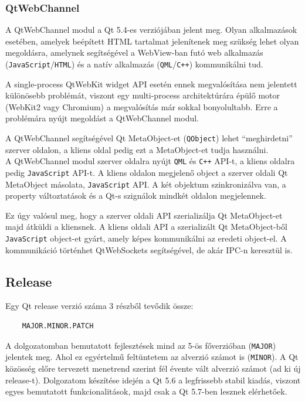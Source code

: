 \documentclass[12pt]{report}
\begin{document}
\subsubsection{QtWebChannel}
A QtWebChannel modul a Qt 5.4-es verziójában jelent meg. Olyan alkalmazások esetében,
amelyek beépített HTML tartalmat jelenítenek meg szükség lehet olyan megoldásra,
amelynek segítségével a WebView-ban futó web alkalmazás (\texttt{JavaScript}/\texttt{HTML})
és a natív alkalmazás (\texttt{QML}/\texttt{C++}) kommunikálni tud.

A single-process QtWebKit widget API esetén ennek megvalósítása nem jelentett különösebb
problémát, viszont egy multi-process architektúrára épülő motor (WebKit2 vagy Chromium)
a megvalósítás már sokkal bonyolultabb. Erre a problémára nyújt megoldást a QtWebChannel
modul.

A QtWebChannel segítségével Qt MetaObject-et (\texttt{QObject}) lehet ``meghirdetni'' \\
szerver oldalon, a kliens oldal pedig ezt a MetaObject-et tudja használni. \\
A QtWebChannel modul szerver oldalra nyújt \texttt{QML} és \texttt{C++} API-t,
a kliens oldalra pedig \texttt{JavaScript} API-t. A kliens oldalon megjelenő object a
szerver oldali Qt MetaObject másolata, \texttt{JavaScript} API. A két objektum szinkronizálva
van, a property változtatások és a Qt-s szignálok mindkét oldalon megjelennek.

Ez úgy valósul meg, hogy a szerver oldali API szerializálja Qt MetaObject-et majd átküldi
a kliensnek. A kliens oldali API a szerializált Qt MetaObject-ből \texttt{JavaScript}
object-et gyárt, amely képes kommunikálni az eredeti object-el. A kommunikáció történhet
QtWebSockets segítségével, de akár IPC-n keresztül is.
\cite{bib:qt-doc-qt-webchannel, bib:kdab-qt-webchannel}


\subsection{Release}
Egy Qt release verzió száma 3 részből tevődik össze:
\begin{verbatim}
    MAJOR.MINOR.PATCH
\end{verbatim}
A dolgozatomban bemutatott fejlesztések mind az 5-ös főverzióban (\texttt{MAJOR})
jelentek meg. Ahol ez egyértelmű feltüntetem az alverzió számot is (\texttt{MINOR}).
A Qt közösség előre tervezett menetrend szerint fél évente vált alverzió számot (ad ki új
release-t). Dolgozatom készítése idején a Qt 5.6 a legfrissebb stabil kiadás, viszont egyes
bemutatott funkcionalitások, majd csak a Qt 5.7-ben lesznek elérhetőek.
\end{document}
